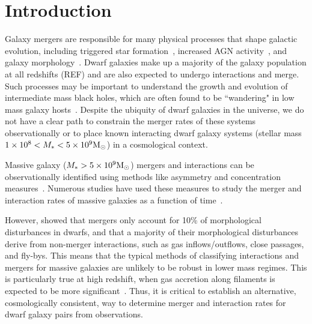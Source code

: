 \documentclass[twocolumn]{aastex63}
\newcommand\msun{\rm{M}_{\odot}}
\begin{document}
\section{Introduction} \label{sec:intro}
Galaxy mergers are responsible for many physical processes that shape galactic evolution, including triggered star formation~\citep{mihos96, hopkins13, patton20,hani20}, increased AGN activity~\citep{hopkins08,comerford15,ellison19}, and galaxy morphology~\citep[e.g.,][]{rg17}. Dwarf galaxies  make up a majority of the galaxy population at all redshifts (REF) and are also expected to undergo interactions and merge. Such processes may be important to understand the growth and evolution of intermediate mass black holes, which are often found to be ``wandering" in low mass galaxy hosts~\citep{stemo20,reines20}. Despite the ubiquity of dwarf galaxies in the universe, we do not have a clear path to constrain the merger rates of these systems observationally or to place known interacting dwarf galaxy systems (stellar mass $1\times10^8<M_* < 5\times10^9\msun$) in a cosmological context. 

Massive galaxy ($M_* > 5\times10^9\msun$) mergers and interactions can be observationally identified using methods like asymmetry and concentration measures~\citep{conselice2000, lotz04}. Numerous studies have used these measures to study the merger and interaction rates of massive galaxies as a function of time~\citep[e.g.,][]{lotz11,casteels14}. 

However, \citet{martin21} showed that mergers only account for 10\% of morphological disturbances in dwarfs, and that a majority of their morphological disturbances derive from non-merger interactions, such as gas inflows/outflows, close passages, and fly-bys. This means that the typical methods of classifying interactions and mergers for massive galaxies are unlikely to be robust in lower mass regimes. This is particularly true at high redshift, when gas accretion along filaments is expected to be more significant~\citep{keres09}. Thus, it is critical to establish an alternative, cosmologically consistent, way to determine merger and interaction rates for dwarf galaxy pairs from observations. 
\end{document}
